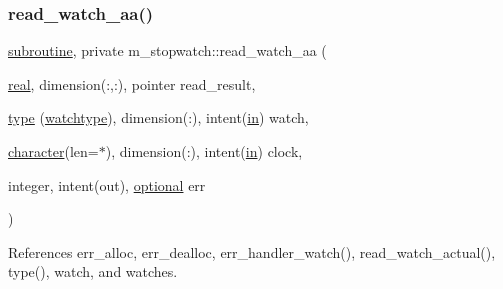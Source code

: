 \subsubsection{\texorpdfstring{read\+\_\+watch\+\_\+aa()}{read\_watch\_aa()}}
{\footnotesize\ttfamily \hyperlink{M__stopwatch_83_8txt_acfbcff50169d691ff02d4a123ed70482}{subroutine}, private m\+\_\+stopwatch\+::read\+\_\+watch\+\_\+aa (\begin{DoxyParamCaption}\item[{\hyperlink{read__watch_83_8txt_abdb62bde002f38ef75f810d3a905a823}{real}, dimension(\+:,\+:), pointer}]{read\+\_\+result,  }\item[{\hyperlink{stop__watch_83_8txt_a70f0ead91c32e25323c03265aa302c1c}{type} (\hyperlink{structm__stopwatch_1_1watchtype}{watchtype}), dimension(\+:), intent(\hyperlink{M__journal_83_8txt_afce72651d1eed785a2132bee863b2f38}{in})}]{watch,  }\item[{\hyperlink{option__stopwatch_83_8txt_abd4b21fbbd175834027b5224bfe97e66}{character}(len=$\ast$), dimension(\+:), intent(\hyperlink{M__journal_83_8txt_afce72651d1eed785a2132bee863b2f38}{in})}]{clock,  }\item[{integer, intent(out), \hyperlink{option__stopwatch_83_8txt_aa4ece75e7acf58a4843f70fe18c3ade5}{optional}}]{err }\end{DoxyParamCaption})\hspace{0.3cm}{\ttfamily [private]}}



References err\+\_\+alloc, err\+\_\+dealloc, err\+\_\+handler\+\_\+watch(), read\+\_\+watch\+\_\+actual(), type(), watch, and watches.

\mbox{\label{namespacem__stopwatch_a5cac73ed1e81ddd74796a45b37b31ec4}} 
